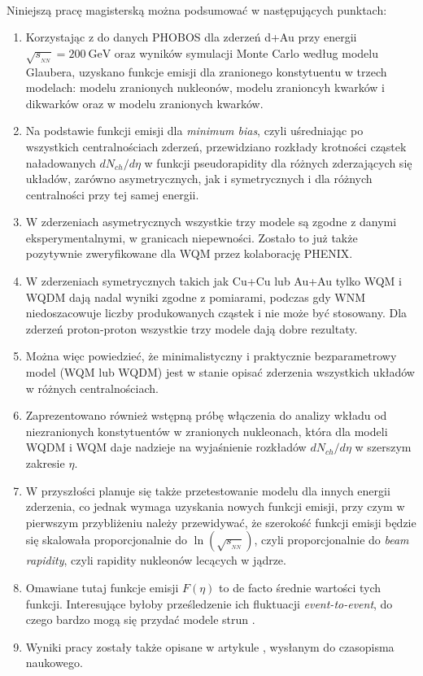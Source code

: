 \documentclass[a4paper,12pt]{article}
\begin{document}
\paragraph{}
Niniejszą pracę magisterską można podsumować w następujących punktach:
\begin{enumerate}[label=(\roman*)]
	\item Korzystając z do danych PHOBOS dla zderzeń d+Au przy energii $\sqrt{s_{_{NN}}} = 200~\text{GeV}$ oraz wyników symulacji Monte Carlo według modelu Glaubera, uzyskano funkcje emisji dla zranionego konstytuentu w trzech modelach: modelu zranionych nukleonów, modelu zranioncyh kwarków i dikwarków oraz w modelu zranionych kwarków.
	\item Na podstawie funkcji emisji dla \textit{minimum bias}, czyli uśredniając po wszystkich centralnościach zderzeń, przewidziano rozkłady krotności cząstek naładowanych $dN_{ch}/d\eta$ w funkcji pseudorapidity dla różnych zderzających się układów, zarówno asymetrycznych, jak i symetrycznych i dla różnych centralności przy tej samej energii.
	\item W zderzeniach asymetrycznych wszystkie trzy modele są zgodne z danymi eksperymentalnymi, w granicach niepewności. Zostało to już także pozytywnie zweryfikowane dla WQM przez kolaborację PHENIX. 
	\item W zderzeniach symetrycznych takich jak Cu+Cu lub Au+Au tylko WQM i WQDM dają nadal wyniki zgodne z pomiarami, podczas gdy WNM niedoszacowuje liczby produkowanych cząstek i nie może być stosowany. Dla zderzeń proton-proton wszystkie trzy modele dają dobre rezultaty.
	\item Można więc powiedzieć, że minimalistyczny i praktycznie bezparametrowy model (WQM lub WQDM) jest w stanie opisać zderzenia wszystkich układów w różnych centralnościach.
	\item Zaprezentowano również wstępną próbę włączenia do analizy wkładu od niezranionych konstytuentów w zranionych nukleonach, która dla modeli WQDM i WQM daje nadzieje na wyjaśnienie rozkładów $dN_{ch}/d\eta$ w szerszym zakresie $\eta$.
	\item W przyszłości planuje się także przetestowanie modelu dla innych energii zderzenia, co jednak wymaga uzyskania nowych funkcji emisji, przy czym w pierwszym przybliżeniu należy przewidywać, że szerokość funkcji emisji  będzie się skalowała proporcjonalnie do $\ln(\sqrt{s_{_{NN}}})$, czyli proporcjonalnie do \textit{beam rapidity}, czyli rapidity nukleonów lecących w jądrze.
	\item Omawiane tutaj funkcje emisji $F(\eta)$ to de facto średnie wartości tych funkcji. Interesujące byłoby prześledzenie ich fluktuacji \textit{event-to-event}, do czego bardzo mogą się przydać modele strun \cite{Rohrmoser:2018shp,Broniowski:2015oif}.
	\item Wyniki pracy zostały także opisane w artykule \cite{Barej:2019xef}, wysłanym do czasopisma naukowego.
\end{enumerate}
\end{document}
